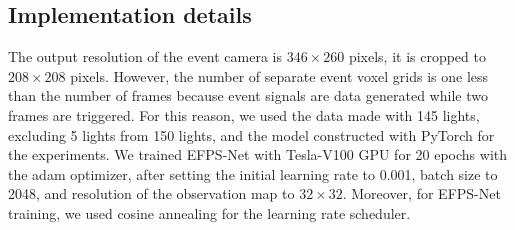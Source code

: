 \subsection{Implementation details}
The output resolution of the event camera is $346 \times 260$ pixels, it is cropped to $208 \times 208$ pixels. However, the number of separate event voxel grids is one less than the number of frames because event signals are data generated while two frames are triggered. For this reason, we used the data made with 145 lights, excluding 5 lights from 150 lights, and the model constructed with PyTorch for the experiments. We trained EFPS-Net with Tesla-V100 GPU for 20 epochs with the adam optimizer, after setting the initial learning rate to 0.001, batch size to 2048, and resolution of the observation map to $32 \times 32$. Moreover, for EFPS-Net training, we used cosine annealing for the learning rate scheduler.

